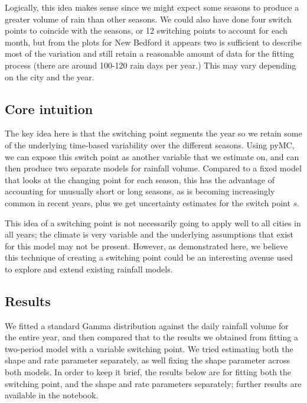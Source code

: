 \documentclass{article}
\begin{document}
Logically, this idea makes sense since we might expect some seasons to produce a greater volume of rain than other seasons. We could also have done four switch points to coincide with the seasons, or 12 switching points to account for each month, but from the plots for New Bedford it appears two is sufficient to describe most of the variation and still retain a reasonable amount of data for the fitting process (there are around 100-120 rain days per year.) This may vary depending on the city and the year.

\subsection{Core intuition}
The key idea here is that the switching point segments the year so we retain some of the underlying time-based variability over the different seasons. Using pyMC, we can expose this switch point as another variable that we estimate on, and can then produce two separate models for rainfall volume. Compared to a fixed model that looks at the changing point for each season, this has the advantage of accounting for unusually short or long seasons, as is becoming increasingly common in recent years, plus we get uncertainty estimates for the switch point $s$.

This idea of a switching point is not necessarily going to apply well to all cities in all years; the climate is very variable and the underlying assumptions that exist for this model may not be present. However, as demonstrated here, we believe this technique of creating a switching point could be an interesting avenue used to explore and extend existing rainfall models.

\subsection{Results}
We fitted a standard Gamma distribution against the daily rainfall volume for the entire year, and then compared that to the results we obtained from fitting a two-period model with a variable switching point. We tried estimating both the shape and rate parameter separately, as well fixing the shape parameter across both models. In order to keep it brief, the results below are for fitting both the switching point, and the shape and rate parameters separately; further results are available in the notebook.
\end{document}
